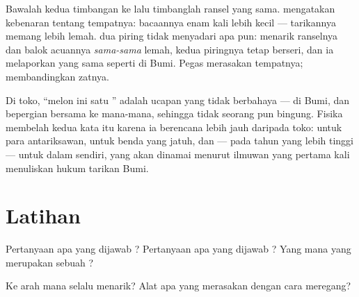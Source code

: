\begin{example}\label{ex:g4:weight-and-mass:twoscales}
Bawalah kedua timbangan ke  lalu timbanglah ransel yang sama.
\emph{} mengatakan kebenaran tentang tempatnya: bacaannya
enam kali lebih kecil --- tarikannya memang lebih lemah.
\emph{} dua piring tidak menyadari apa pun:  menarik
ranselnya dan balok acuannya \emph{sama-sama} lemah, kedua piringnya tetap
berseri, dan ia melaporkan  yang sama seperti di Bumi. Pegas
merasakan tempatnya;  membandingkan zatnya.
\end{example}

\begin{remark}\label{rem:g4:weight-and-mass:words}
Di toko, ``melon ini  satu '' adalah ucapan yang tidak
berbahaya --- di Bumi,  dan  bepergian bersama ke mana-mana,
sehingga tidak seorang pun bingung. Fisika membelah kedua kata itu
karena ia berencana lebih jauh daripada toko: untuk para antariksawan,
untuk benda yang jatuh, dan --- pada tahun yang lebih tinggi --- untuk
  dalam  sendiri, yang akan dinamai menurut
ilmuwan yang pertama kali menuliskan hukum tarikan Bumi.
\end{remark}

\section{Latihan}

\begin{exercise}[$\star$]\label{exo:g4:weight-and-mass:1}
Pertanyaan apa yang dijawab ? Pertanyaan apa yang dijawab ?
Yang mana yang merupakan sebuah ?
\end{exercise}

\begin{exercise}[$\star$]\label{exo:g4:weight-and-mass:2}
Ke arah mana  selalu menarik? Alat apa yang merasakan 
dengan cara meregang?
\end{exercise}


